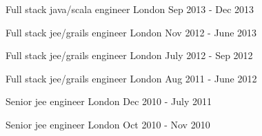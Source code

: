 \begin{cventries}
    \cventry
    {Full stack java/scala engineer}
    {} 
    {London}
    {Sep 2013 - Dec 2013}
    {}
    {}

    \cventry
    {Full stack jee/grails engineer}
    {} 
    {London}
    {Nov 2012 - June 2013}
    {}
    {}

    \cventry
    {Full stack jee/grails engineer}
    {} 
    {London}
    {July 2012 - Sep 2012}
    {}
    {}

    \cventry
    {Full stack jee/grails engineer}
    {} 
    {London}
    {Aug 2011 - June 2012}
    {}
    {}

    \cventry
    {Senior jee engineer}
    {} 
    {London}
    {Dec 2010 - July 2011}
    {}
    {}

    \cventry
    {Senior jee engineer}
    {} 
    {London}
    {Oct 2010 - Nov 2010}
    {}
    {}
\end{cventries}



